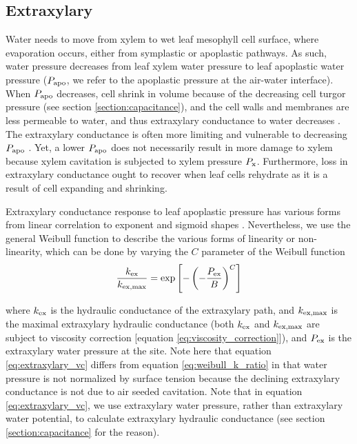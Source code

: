 \documentclass[twoside,10pt]{report}
\begin{document}
\subsection{Extraxylary}
\par Water needs to move from xylem to wet leaf mesophyll cell surface, where evaporation occurs, either from symplastic or apoplastic pathways. As such, water pressure decreases from leaf xylem water pressure to leaf apoplastic water pressure ($P_\text{apo}$, we refer to the apoplastic pressure at the air-water interface). When $P_\text{apo}$ decreases, cell shrink in volume because of the decreasing cell turgor pressure (see section \ref{section:capacitance}), and the cell walls and membranes are less permeable to water, and thus extraxylary conductance to water decreases \citep{buckley2015does, buckley2017sites}. The extraxylary conductance is often more limiting and vulnerable to decreasing $P_\text{apo}$ \citep{scoffoni2017outside}. Yet, a lower $P_\text{apo}$ does not necessarily result in more damage to xylem because xylem cavitation is subjected to xylem pressure $P_\text{x}$. Furthermore, loss in extraxylary conductance ought to recover when leaf cells rehydrate as it is a result of cell expanding and shrinking.

\par Extraxylary conductance response to leaf apoplastic pressure has various forms from linear correlation to exponent and sigmoid shapes \citep{scoffoni2017outside}. Nevertheless, we use the general Weibull function to describe the various forms of linearity or non-linearity, which can be done by varying the $C$ parameter of the Weibull function
\begin{equation}
    \dfrac{k_\text{ex}}{k_\text{ex,max}} = \exp \left[ -\left( -\dfrac{P_\text{ex}}{B} \right) ^ C \right]
    \label{eq:extraxylary_vc}
\end{equation}
\par \noindent where $k_\text{ex}$ is the hydraulic conductance of the extraxylary path, and $k_\text{ex,max}$ is the maximal extraxylary hydraulic conductance (both $k_\text{ex}$ and $k_\text{ex,max}$ are subject to viscosity correction [equation \ref{eq:viscosity_correction}]), and $P_\text{ex}$ is the extraxylary water pressure at the site. Note here that equation \ref{eq:extraxylary_vc} differs from equation \ref{eq:weibull_k_ratio} in that water pressure is not normalized by surface tension because the declining extraxylary conductance is not due to air seeded cavitation. Note that in equation \ref{eq:extraxylary_vc}, we use extraxylary water pressure, rather than extraxylary water potential, to calculate extraxylary hydraulic conductance (see section \ref{section:capacitance} for the reason).
\end{document}
